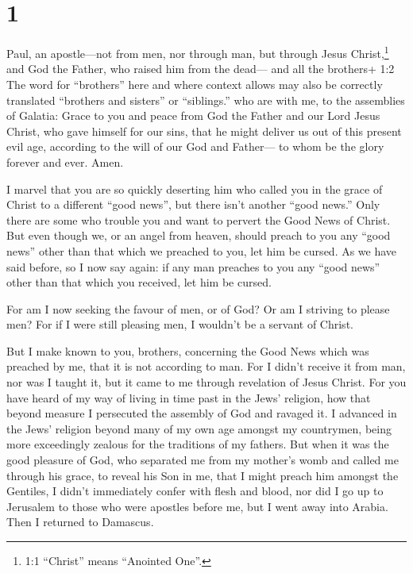 \hypertarget{section}{%
\section{1}\label{section}}

 Paul, an apostle---not from men, nor through man, but
through Jesus Christ,\footnote{1:1 ``Christ'' means ``Anointed One''.}
and God the Father, who raised him from the dead---  and all
the brothers+ 1:2 The word for ``brothers'' here and where context
allows may also be correctly translated ``brothers and sisters'' or
``siblings.'' who are with me, to the assemblies of Galatia:
 Grace to you and peace from God the Father and our Lord
Jesus Christ,  who gave himself for our sins, that he might
deliver us out of this present evil age, according to the will of our
God and Father---  to whom be the glory forever and ever.
Amen.

 I marvel that you are so quickly deserting him who called
you in the grace of Christ to a different ``good news'', 
but there isn't another ``good news.'' Only there are some who trouble
you and want to pervert the Good News of Christ.  But even
though we, or an angel from heaven, should preach to you any ``good
news'' other than that which we preached to you, let him be cursed.
 As we have said before, so I now say again: if any man
preaches to you any ``good news'' other than that which you received,
let him be cursed.

 For am I now seeking the favour of men, or of God? Or am I
striving to please men? For if I were still pleasing men, I wouldn't be
a servant of Christ.

 But I make known to you, brothers, concerning the Good
News which was preached by me, that it is not according to man.
 For I didn't receive it from man, nor was I taught it, but
it came to me through revelation of Jesus Christ.  For you
have heard of my way of living in time past in the Jews' religion, how
that beyond measure I persecuted the assembly of God and ravaged it.
 I advanced in the Jews' religion beyond many of my own age
amongst my countrymen, being more exceedingly zealous for the traditions
of my fathers.  But when it was the good pleasure of God,
who separated me from my mother's womb and called me through his grace,
 to reveal his Son in me, that I might preach him amongst
the Gentiles, I didn't immediately confer with flesh and blood,
 nor did I go up to Jerusalem to those who were apostles
before me, but I went away into Arabia. Then I returned to Damascus.

